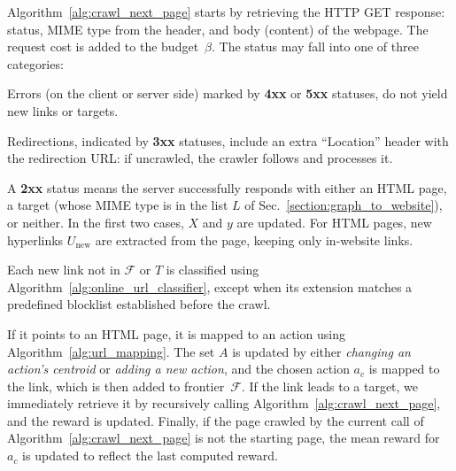 Algorithm~\ref{alg:crawl_next_page} starts by retrieving %
the HTTP GET response: status, MIME type from the header, and body (content) of the webpage. The request cost is added to the budget~$\beta$. The 
status may fall into one of three categories:
\begin{inparaenum}
	\item Errors (on the client or server side) marked by \textbf{4xx} or \textbf{5xx} statuses, do not yield new links or targets.
	\item Redirections, indicated by \textbf{3xx} statuses, include an extra ``Location'' header with the redirection URL: if uncrawled, the crawler follows and processes it.
	\item A \textbf{2xx} status means the server successfully responds with either an HTML page, a target (whose MIME type is in the list $L$ of Sec.~\ref{section:graph_to_website}), or neither. In the first two cases, $X$ and $y$ are updated. For HTML pages, new hyperlinks $U_{\textrm{new}}$ are extracted from the page, keeping only in-website links.
\end{inparaenum}
Each new link not in $\mathcal{F}$ or $T$ is classified using Algorithm~\ref{alg:online_url_classifier}, except when its extension matches a predefined blocklist established before the crawl.

If it points to an HTML page, it is mapped to an action using Algorithm~\ref{alg:url_mapping}. The set $A$ is updated by either \emph{changing an action's centroid} or \emph{adding a new action}, and the chosen action $a_c$ is mapped to the link, which is then added to frontier~$\mathcal{F}$. If the link leads to a target, we immediately retrieve it by recursively calling Algorithm~\ref{alg:crawl_next_page}, and the reward is updated. Finally, if the page crawled by the current call of Algorithm~\ref{alg:crawl_next_page} is not the starting page, the mean reward for $a_c$ is updated to reflect the last computed reward.


